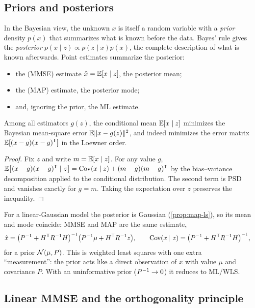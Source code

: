\subsection{Priors and posteriors}

In the Bayesian view, the unknown $x$ is itself a random variable with a \emph{prior} density $p(x)$ that summarizes what is known before the
data. Bayes' rule gives the \emph{posterior} $p(x\mid z) \propto p(z\mid x)p(x)$, the complete description of what is known afterwards. Point estimates
summarize the posterior:
\begin{itemize}
  \item the  (MMSE) estimate $\hat x = \mathbb{E}[x\mid z]$, the posterior mean;
  \item the  (MAP) estimate, the posterior mode;
  \item and, ignoring the prior, the ML estimate.
\end{itemize}

\begin{theorem}
\label{thm:mmse}
Among all estimators $g(z)$, the conditional mean $\mathbb{E}[x\mid z]$ minimizes the Bayesian mean-square error $\mathbb{E}\|x - g(z)\|^2$, and indeed minimizes the
error matrix $\mathbb{E}[(x - g)(x - g)^{\mathsf{T}}]$ in the Loewner order.
\end{theorem}
\begin{proof}
Fix $z$ and write $m = \mathbb{E}[x\mid z]$. For any value $g$, $\mathbb{E}\big[(x - g)(x - g)^{\mathsf{T}}\mid z\big] = \operatorname{Cov}(x\mid z) + (m - g)(m - g)^{\mathsf{T}}$ by the bias--variance decomposition
applied to the conditional distribution. The second term is PSD and vanishes exactly for $g = m$. Taking the expectation over $z$ preserves the
inequality.
\end{proof}

For a linear-Gaussian model the posterior is Gaussian (\cref{prop:map-ls}), so its mean and mode coincide: MMSE and MAP are the same estimate,
\begin{equation}
  \hat x = \big(P^{-1} + H^{\mathsf{T}} R^{-1} H\big)^{-1}\big(P^{-1}\mu + H^{\mathsf{T}} R^{-1} z\big), \qquad \operatorname{Cov}(x\mid z) = \big(P^{-1} + H^{\mathsf{T}} R^{-1} H\big)^{-1},
  \label{eq:bayes-linear}
\end{equation}
for a prior $\mathcal{N}(\mu, P)$. This is weighted least squares with one extra ``measurement'': the prior acts like a direct observation of $x$ with
value $\mu$ and covariance $P$. With an uninformative prior ($P^{-1}\to0$) it reduces to ML/WLS.

\subsection{Linear MMSE and the orthogonality principle}


